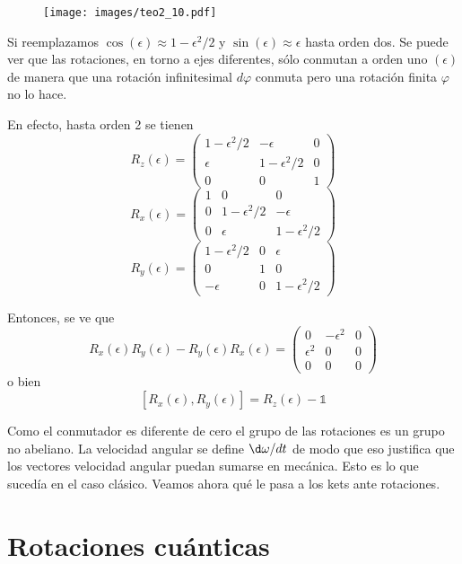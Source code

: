 \documentclass[10pt,oneside]{CBFT_book}
\begin{document}
\begin{figure}[!htb]
	\begin{center}
	\texttt{[image: images/teo2\_10.pdf]}
	\end{center}
	\caption{}
\end{figure} 

Si reemplazamos $\cos(\epsilon) \approx 1 - \epsilon^2/2$ y $\sin(\epsilon) \approx \epsilon$ hasta orden dos.
Se puede ver que las rotaciones, en torno a ejes diferentes, sólo conmutan a orden uno $(\epsilon)$ de manera 
que una rotación infinitesimal $d\varphi$ conmuta pero una rotación finita $\varphi$ no lo hace.

En efecto, hasta orden 2 se tienen 
\[
	R_z(\epsilon) = \begin{pmatrix}
	1 - \epsilon^2/2 & - \epsilon  & 0 \\
	\epsilon & 1 - \epsilon^2/2 & 0 \\
	0 & 0 & 1
	\end{pmatrix}
\]
\[
	R_x(\epsilon) = \begin{pmatrix}
	1 & 0 & 0 \\
	0 & 1 - \epsilon^2/2 & -\epsilon \\
	0 & \epsilon & 1 - \epsilon^2/2
	\end{pmatrix}
\]
\[
	R_y(\epsilon) = \begin{pmatrix}
	1 - \epsilon^2/2 & 0 & \epsilon \\
	0 & 1 & 0 \\
	-\epsilon & 0 & 1 - \epsilon^2/2
	\end{pmatrix}
\]

Entonces, se ve que
\[
	R_x(\epsilon) R_y(\epsilon) - R_y(\epsilon) R_x(\epsilon) = 
	\begin{pmatrix}
	0 & -\epsilon^2  & 0 \\
	\epsilon^2 & 0 & 0 \\
	0 & 0 & 0
	\end{pmatrix}	
\]
o bien
\[
	[ R_x(\epsilon), R_y(\epsilon) ] =  R_z(\epsilon) - \mathbb{1}
\]

Como el conmutador es diferente de cero el grupo de las rotaciones es un grupo no abeliano.
La velocidad angular se define $\d\omega/dt$ de modo que eso justifica que los vectores
velocidad angular puedan sumarse en mecánica.
Esto es lo que sucedía en el caso clásico. Veamos ahora qué le pasa a los kets ante rotaciones.

\section{Rotaciones cuánticas}
\end{document}

